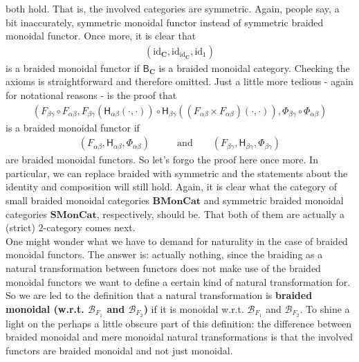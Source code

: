 both hold.
That is, the involved categories are symmetric.
Again, people say, a bit inaccurately, {\glqq}symmetric monoidal functor{\grqq} instead of {\glqq}symmetric braided monoidal functor{\grqq}.
Once more, it is clear that
\begin{align*}
  \left(
    \mathrm{id}_{\mathbf{C}},
    \mathrm{id}_{\mathrm{id}_{\mathbf{C}}},
    \mathrm{id}_{1}
  \right)
\end{align*}
is a braided monoidal functor if $\mathsf{B}_{\mathbf{C}}$ is a braided monoidal category.
Checking the axioms is straightforward and therefore omitted.
Just a little more tedious - again for notational reasons - is the proof that
\begin{align*}
  \left(
    F_{\beta\gamma}
    \circ
    F_{\alpha\beta},
    F_{\beta\gamma}
    \left(
      \mathsf{H}_{\alpha\beta}(\cdot,\cdot)
    \right)
    \circ
    \mathsf{H}_{\beta\gamma}
    \left(
      \left(
        F_{\alpha\beta}
        \times
        F_{\alpha\beta}
      \right)
      (\cdot,\cdot)
    \right),
    \Phi_{\beta\gamma}
    \circ
    \Phi_{\alpha\beta}
  \right)
\end{align*}
is a braided monoidal functor if
\begin{align*}
  \left(
    F_{\alpha\beta},
    \mathsf{H}_{\alpha\beta},
    \Phi_{\alpha\beta}
  \right)
  \qquad
  &\text{and}
  \qquad
  \left(
    F_{\beta\gamma},
    \mathsf{H}_{\beta\gamma},
    \Phi_{\beta\gamma}
  \right)
\end{align*}
are braided monoidal functors.
So let's forgo the proof here once more.
In particular, we can replace braided with symmetric and the statements about the identity and composition will still hold.
Again, it is clear what the category of small braided monoidal categories $\mathbf{BMonCat}$ and symmetric braided monoidal categories $\mathbf{SMonCat}$, respectively, should be.
That both of them are actually a (strict) $2$-category comes next.
\\
One might wonder what we have to demand for naturality in the case of braided monoidal functors.
The answer is: actually nothing, since the braiding as a natural transformation between functors does not make use of the braided monoidal functors we want to define a certain kind of natural transformation for.
So we are led to the definition that a natural transformation is \textbf{braided monoidal (w.r.t. $\mathcal{B}_{F_{1}}$ and $\mathcal{B}_{F_{2}}$)} if it is monoidal w.r.t.
$\mathcal{B}_{F_{1}}$ and $\mathcal{B}_{F_{2}}$.
To shine a light on the perhaps a little obscure part of this definition: the difference between braided monoidal and mere monoidal natural transformations is that the involved functors are braided monoidal and not just monoidal.
